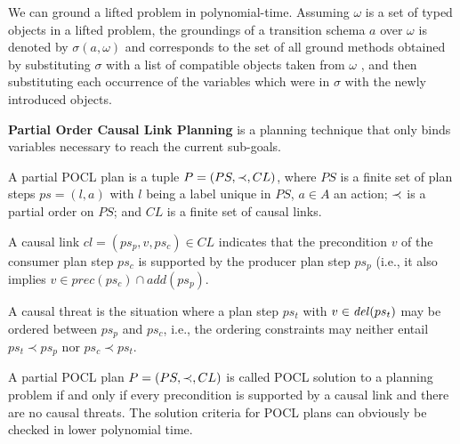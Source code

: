 We can ground a lifted problem in polynomial-time. Assuming $\omega$ is a set of typed objects in a lifted problem, the groundings of
a transition schema $a$ over $\omega$  is denoted by $\sigma(a, \omega)$ and corresponds to the set of all ground methods obtained by
substituting $\sigma$ with a list of compatible objects taken from $\omega$ , and then substituting each occurrence of the variables
which were in $\sigma$ with the newly introduced objects.  

\textbf{Partial Order Causal Link Planning} is a planning technique that only binds variables necessary to reach the current sub-goals.

A partial POCL plan is a tuple $P = (PS, \mathit{ \mathord{\prec} }, CL)$, where 
$PS$ is a finite set of plan steps $ps = (l, a)$ with $l$ being a label
unique in $PS$, $a \in A$ an action; $\mathit{ \mathord{\prec} }$ is a partial order on $PS$;
and $CL$ is a finite set of causal links. 

A causal link $cl = (ps_p, v, ps_c) \in CL$ indicates that the precondition $v$ of the consumer plan step $ps_c$ is
supported by the producer plan step $ps_p$ (i.e., it also implies
$v \in prec(ps_c) \cap add (ps_p)$.


A causal threat is the situation where a plan step $ps_t$ with $v \in \mathit{del} (ps_t)$ may be ordered between $ps_p$ and $ps_c$, i.e., the ordering constraints may neither entail $ps_t \prec ps_p$ nor $ps_c \prec ps_t$.

A partial POCL plan $P = (PS , \mathit{ \mathord{\prec} }, CL)$ is called POCL solution to a planning problem if and only if every precondition is supported by a causal link and there are no causal threats. The solution criteria for POCL plans can obviously be checked in lower polynomial time.





